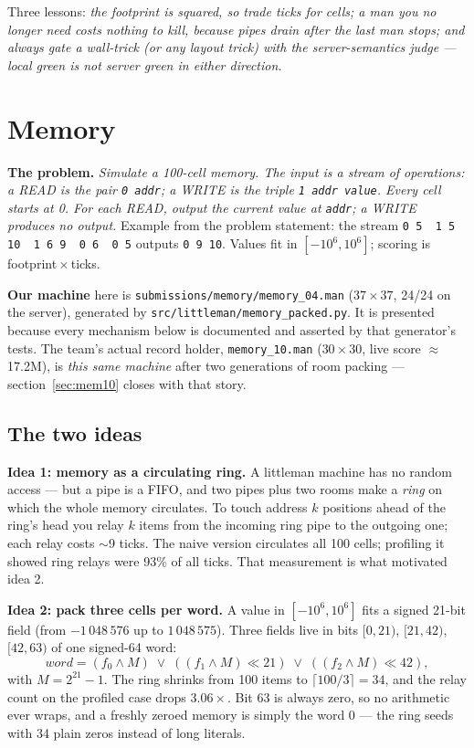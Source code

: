 \documentclass[11pt,a4paper]{article}
\begin{document}
Three lessons: \emph{the footprint is squared, so trade ticks for cells;
a man you no longer need costs nothing to kill, because pipes drain
after the last man stops; and always gate a wall-trick (or any layout
trick) with the server-semantics judge --- local green is not server
green in either direction.}

\clearpage
\section{Memory}

\textbf{The problem.} \emph{Simulate a 100-cell memory. The input is a
stream of operations: a READ is the pair \texttt{0 addr}; a WRITE is the
triple \texttt{1 addr value}. Every cell starts at 0. For each READ, output
the current value at \texttt{addr}; a WRITE produces no output.} Example
from the problem statement: the stream
\texttt{0 5\ \ 1 5 10\ \ 1 6 9\ \ 0 6\ \ 0 5} outputs \texttt{0 9 10}.
Values fit in $[-10^6,10^6]$; scoring is footprint\,$\times$\,ticks.

\textbf{Our machine} here is \texttt{submissions/memory/memory\_04.man}
($37\times 37$, 24/24 on the server), generated by
\texttt{src/littleman/memory\_packed.py}. It is presented because every
mechanism below is documented and asserted by that generator's tests. The
team's actual record holder, \texttt{memory\_10.man} ($30\times30$, live
score $\approx$17.2M), is \emph{this same machine} after two generations
of room packing --- section~\ref{sec:mem10} closes with that story.

\subsection{The two ideas}

\textbf{Idea 1: memory as a circulating ring.} A littleman machine has no
random access --- but a pipe is a FIFO, and two pipes plus two rooms make a
\emph{ring} on which the whole memory circulates. To touch address $k$
positions ahead of the ring's head you relay $k$ items from the incoming
ring pipe to the outgoing one; each relay costs $\sim$9 ticks. The naive
version circulates all 100 cells; profiling it showed ring relays were 93\%
of all ticks. That measurement is what motivated idea 2.

\textbf{Idea 2: pack three cells per word.} A value in $[-10^6,10^6]$ fits a
signed 21-bit field (from $-1\,048\,576$ up to $1\,048\,575$). Three fields live in
bits $[0,21)$, $[21,42)$, $[42,63)$ of one signed-64 word:
\[
  \mathit{word}=(f_0 \wedge M)\;\vee\;((f_1\wedge M)\ll 21)\;\vee\;((f_2\wedge M)\ll 42),
\]
with $M=2^{21}-1$.
The ring shrinks from 100 items to $\lceil 100/3\rceil=34$, and the relay
count on the profiled case drops $3.06\times$. Bit 63 is always zero, so no
arithmetic ever wraps, and a freshly zeroed memory is simply the word 0 ---
the ring seeds with 34 plain zeros instead of long literals.
\end{document}
